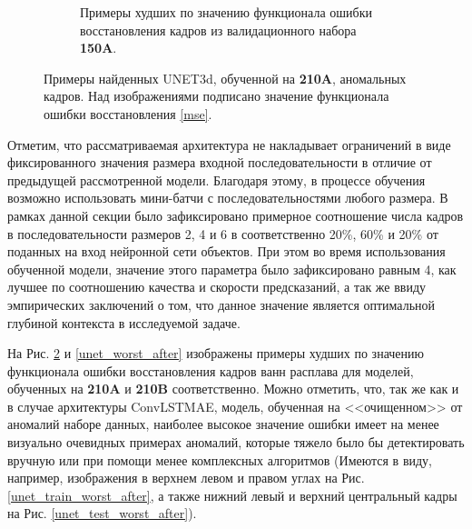 \documentclass{article}
\begin{document}
\begin{figure}[H]
\begin{subfigure}{.47\textwidth}
            \caption{Примеры худших по значению функционала ошибки восстановления кадров из валидационного набора \textbf{150A}.}\label{unet_test_worst_before}
        \end{subfigure}
        \caption{Примеры найденных UNET3d, обученной на \textbf{210A}, аномальных кадров. Над изображениями подписано значение функционала ошибки восстановления \eqref{mse}.}\label{unet_worst_before}
    \end{figure}
    
    Отметим, что рассматриваемая архитектура не накладывает ограничений в виде фиксированного значения размера входной последовательности в отличие от предыдущей рассмотренной модели. Благодаря этому, в процессе обучения возможно использовать мини-батчи с последовательностями любого размера. В рамках данной секции было зафиксировано примерное соотношение числа кадров в последовательности размеров 2, 4 и 6 в соответственно 20\%, 60\% и 20\% от поданных на вход нейронной сети объектов. При этом во время использования обученной модели, значение этого параметра было зафиксировано равным 4, как лучшее по соотношению качества и скорости предсказаний, а так же ввиду эмпирических заключений о том, что данное значение является оптимальной глубиной контекста в исследуемой задаче.


    На Рис. \ref{unet_worst_before} и \ref{unet_worst_after} изображены примеры худших по значению функционала ошибки восстановления кадров ванн расплава для моделей, обученных на \textbf{210A} и \textbf{210B} соответственно. Можно отметить, что, так же как и в случае архитектуры ConvLSTMAE, модель, обученная на <<очищенном>> от аномалий наборе данных, наиболее высокое значение ошибки имеет на менее визуально очевидных примерах аномалий, которые тяжело было бы детектировать вручную или при помощи менее комплексных алгоритмов (Имеются в виду, например, изображения в верхнем левом и правом углах на Рис. \ref{unet_train_worst_after}, а также нижний левый и верхний центральный кадры на Рис. \ref{unet_test_worst_after}).
\end{document}

